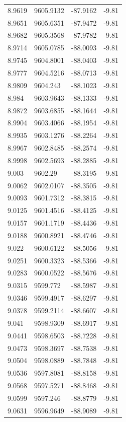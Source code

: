 \begin{table}[H]
\begin{tabular}{llll}
8.9619 & 9605.9132 & -87.9162 & -9.81 \\
8.9651 & 9605.6351 & -87.9472 & -9.81 \\
8.9682 & 9605.3568 & -87.9782 & -9.81 \\
8.9714 & 9605.0785 & -88.0093 & -9.81 \\
8.9745 & 9604.8001 & -88.0403 & -9.81 \\
8.9777 & 9604.5216 & -88.0713 & -9.81 \\
8.9809 & 9604.243 & -88.1023 & -9.81 \\
8.984 & 9603.9643 & -88.1333 & -9.81 \\
8.9872 & 9603.6855 & -88.1644 & -9.81 \\
8.9904 & 9603.4066 & -88.1954 & -9.81 \\
8.9935 & 9603.1276 & -88.2264 & -9.81 \\
8.9967 & 9602.8485 & -88.2574 & -9.81 \\
8.9998 & 9602.5693 & -88.2885 & -9.81 \\
9.003 & 9602.29 & -88.3195 & -9.81 \\
9.0062 & 9602.0107 & -88.3505 & -9.81 \\
9.0093 & 9601.7312 & -88.3815 & -9.81 \\
9.0125 & 9601.4516 & -88.4125 & -9.81 \\
9.0157 & 9601.1719 & -88.4436 & -9.81 \\
9.0188 & 9600.8921 & -88.4746 & -9.81 \\
9.022 & 9600.6122 & -88.5056 & -9.81 \\
9.0251 & 9600.3323 & -88.5366 & -9.81 \\
9.0283 & 9600.0522 & -88.5676 & -9.81 \\
9.0315 & 9599.772 & -88.5987 & -9.81 \\
9.0346 & 9599.4917 & -88.6297 & -9.81 \\
9.0378 & 9599.2114 & -88.6607 & -9.81 \\
9.041 & 9598.9309 & -88.6917 & -9.81 \\
9.0441 & 9598.6503 & -88.7228 & -9.81 \\
9.0473 & 9598.3697 & -88.7538 & -9.81 \\
9.0504 & 9598.0889 & -88.7848 & -9.81 \\
9.0536 & 9597.8081 & -88.8158 & -9.81 \\
9.0568 & 9597.5271 & -88.8468 & -9.81 \\
9.0599 & 9597.246 & -88.8779 & -9.81 \\
9.0631 & 9596.9649 & -88.9089 & -9.81 \\

\end{tabular}
\end{table}
